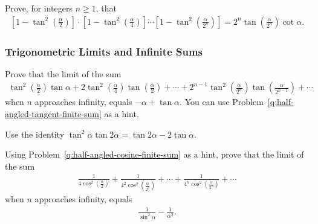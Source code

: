 \documentclass[12pt,a4paper]{memoir}
\theoremstyle{definition}
\begin{document}
\begin{question}
	Prove, for integers $n\geq 1$, that
	\begin{align*}
		\left[1 - \tan^2\left(\frac{\alpha}{2}\right)\right] \cdot
		\left[1 - \tan^2\left(\frac{\alpha}{4}\right)\right]
		\cdots \left[1 - \tan^2\left(\frac{\alpha}{2^n}\right)\right] = 2^n\tan\left(\frac{\alpha}{2^n}\right)\cot \alpha.
	\end{align*}
\end{question}


\subsubsection{Trigonometric Limits and Infinite Sums}


\begin{question}\label{q:half-angled-tangent-infinite-sum}
	Prove that the limit of the sum
	\begin{align*}
		\tan^2\left(\frac{\alpha}{2}\right)\tan \alpha + 2\tan^2\left(\frac{\alpha}{4}\right)\tan\left(\frac{\alpha}{2}\right)+ \cdots + 2^{n-1}\tan^2\left(\frac{\alpha}{2^n}\right)\tan\left(\frac{\alpha}{2^{n-1}}\right)+\cdots
	\end{align*}
	when $n$ approaches infinity, equals $-\alpha+\tan \alpha$. You can use Problem~\ref{q:half-angled-tangent-finite-sum} as a hint.
\end{question}

\begin{solution}
	Use the identity $\tan^2\alpha\tan 2\alpha = \tan 2\alpha - 2\tan \alpha$.
\end{solution}


\begin{question}\label{q:half-angled-cosine-infinite-sum}
	Using Problem~\ref{q:half-angled-cosine-finite-sum} as a hint, prove that the limit of the sum
	\begin{align*}
		\frac{1}{\displaystyle 4\cos^2\left(\frac{\alpha}{2}\right)}+\frac{1}{\displaystyle 4^2\cos^2\left(\frac{\alpha}{2^2}\right)} + \cdots + \frac{1}{\displaystyle 4^n\cos^2\left(\frac{\alpha}{2^n}\right)}+\cdots
	\end{align*}
	when $n$ approaches infinity, equals
	\begin{align*}
		\frac{1}{\sin^2 \alpha} - \frac{1}{\alpha^2}.
	\end{align*}
\end{question}
\end{document}
